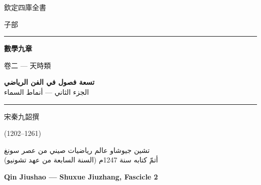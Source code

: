 \documentclass[11pt,a4paper]{article}
\begin{document}
\begin{titlepage}
\begin{center}
\vspace*{1.5cm}

{\fontsize{12}{16}\selectfont 欽定四庫全書}

\vspace{0.8cm}

{\fontsize{10}{14}\selectfont 子部}

\vspace{1.5cm}

\rule{0.85\textwidth}{1.5pt}

\vspace{0.8cm}

{\fontsize{26}{34}\selectfont\bfseries\color{titlecolor} 數學九章}

\vspace{0.4cm}

{\fontsize{14}{20}\selectfont\color{notecolor} 卷二 — 天時類}

\vspace{0.6cm}

{\fontsize{18}{24}\selectfont\arabicfont\beginR\color{titlecolor}
\textbf{تسعة فصول في الفن الرياضي}\\[0.3cm]
{\large الجزء الثاني — أنماط السماء}\endR}

\vspace{0.8cm}

\rule{0.85\textwidth}{1.5pt}

\vspace{1.5cm}

{\fontsize{12}{16}\selectfont 宋\quad 秦九韶\quad 撰}

\vspace{0.3cm}

{\fontsize{10}{14}\selectfont\color{notecolor} (1202--1261)}

\vspace{0.8cm}

{\fontsize{11}{15}\selectfont\arabicfont\beginR\color{notecolor}
تشين جيوشاو \textbullet{} عالم رياضيات صيني من عصر سونغ\\
أتمّ كتابه سنة 1247م (السنة السابعة من عهد تشونيو)
\endR}

\vspace{1.5cm}

{\fontsize{14}{18}\selectfont\bfseries\color{titlecolor} Qin Jiushao --- Shuxue Jiuzhang, Fascicle 2}


\end{center}
\end{titlepage}
\end{document}
